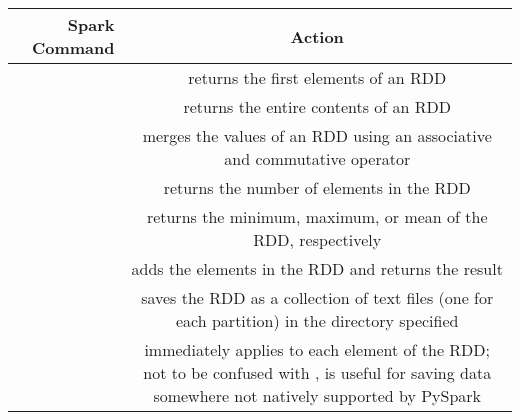 \begin{table}[H]
\begin{tabular}{|r|C|}
\hline
\textbf{Spark Command} & \textbf{Action} \\
\hline
{} & returns the first  elements of an RDD \\
\hline
{} & returns the entire contents of an RDD \\
\hline
{} & merges the values of an RDD using an associative and commutative operator  \\
\hline
{} & returns the number of elements in the RDD \\
\hline
{} & returns the minimum, maximum, or mean of the RDD, respectively \\
\hline
{} & adds the elements in the RDD and returns the result \\
\hline
{} & saves the RDD as a collection of text files (one for each partition) in the directory specified \\
\hline
{} & immediately applies  to each element of the RDD; not to be confused with ,  is useful for saving data somewhere not natively supported by PySpark \\
\hline
\end{tabular}
\end{table}

 
